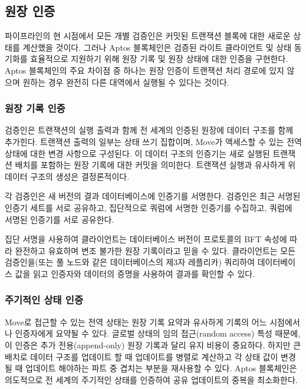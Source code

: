 \documentclass{article}
\begin{document}
\subsection{원장 인증}

파이프라인의 현 시점에서 모든 개별 검증인은 커밋된 트랜잭션 블록에 대한 새로운 상태를 계산했을 것이다. 그러나 Aptos 블록체인은 검증된 라이트 클라이언트 및 상태 동기화를 효율적으로 지원하기 위해 원장 기록 및 원장 상태에 대한 인증을 구현한다. Aptos 블록체인의 주요 차이점 중 하나는 원장 인증이 트랜잭션 처리 경로에 있지 않으며 원하는 경우 완전히 다른 대역에서 실행될 수 있다는 것이다.

\subsubsection{원장 기록 인증}
\label{subsubsec:ledger_history_certification}

검증인은 트랜잭션의 실행 출력과 함께 전 세계의 인증된 원장에 데이터 구조를 함께 추가힌다. 트랜잭션 출력의 일부는 상태 쓰기 집합이며, Move가 액세스할 수 있는 전역 상태에 대한 변경 사항으로 구성된다. 이 데이터 구조의 인증기는 새로 실행된 트랜잭션 배치를 포함하는 원장 기록에 대한 커밋을 의미한다. 트랜잭션 실행과 유사하게 위 데이터 구조의 생성은 결정론적이다.

각 검증인은 새 버전의 결과 데이터베이스에 인증기를 서명한다. 검증인은 최근 서명된 인증기 세트를 서로 공유하고, 집단적으로 쿼럼에 서명한 인증기를 수집하고, 쿼럼에 서명된 인증기를 서로 공유한다.

집단 서명을 사용하여 클라이언트는 데이터베이스 버전이 프로토콜의 BFT 속성에 따라 완전하고 유효하며 변조 불가한 원장 기록이라고 믿을 수 있다. 클라이언트는 모든 검증인을(또는 풀 노드와 같은 데이터베이스의 제3자 레플리카) 쿼리하여 데이터베이스 값을 읽고 인증자와 데이터의 증명을 사용하여 결과를 확인할 수 있다.

\subsubsection{주기적인 상태 인증}
\label{subsubsec:period_state_certification}

Move로 접근할 수 있는 전역 상태는 원장 기록 요약과 유사하게 기록의 어느 시점에서나 인증자에게 요약될 수 있다. 글로벌 상태의 임의 접근(random access) 특성 때문에, 이 인증은 추가 전용(append-only) 원장 기록과 달리 유지 비용이 중요하다. 하지만 큰 배치로 데이터 구조를 업데이트 할 때 업데이트를 병렬로 계산하고 각 상태 값이 변경 될 때 업데이트 해야하는 파트 중 겹치는 부분을 재사용할 수 있다. Aptos 블록체인은 의도적으로 전 세계의 주기적인 상태를 인증하여 공유 업데이트의 중복을 최소화한다.
\end{document}
